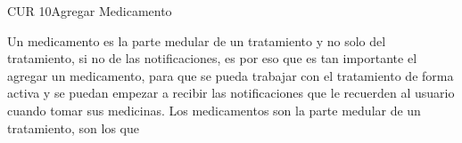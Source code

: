 \begin{UseCase}{CUR 10}{Agregar Medicamento}
	{
		
		Un medicamento es la parte medular de un tratamiento y no solo del tratamiento, si no de las notificaciones, es por eso que es tan importante el agregar un medicamento, para que se pueda trabajar con el tratamiento de forma activa y se puedan empezar a recibir las notificaciones que le recuerden al usuario cuando tomar sus medicinas.
		Los medicamentos son la parte medular de un tratamiento, son los que 
		
	}
	

\end{UseCase}

